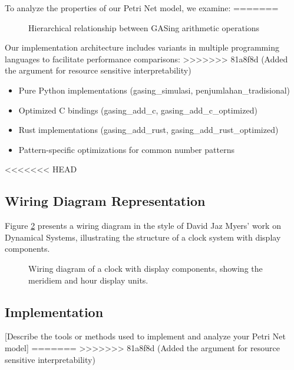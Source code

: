 To analyze the properties of our Petri Net model, we examine:
=======
\begin{figure}[H]
    \centering
    \caption{Hierarchical relationship between GASing arithmetic operations}
    \label{fig:gasing_operations}
\end{figure}

Our implementation architecture includes variants in multiple programming languages to facilitate performance comparisons:
>>>>>>> 81a8f8d (Added the argument for resource sensitive interpretability)

\begin{itemize}
    \item Pure Python implementations (gasing\_simulasi, penjumlahan\_tradisional)
    \item Optimized C bindings (gasing\_add\_c, gasing\_add\_c\_optimized)
    \item Rust implementations (gasing\_add\_rust, gasing\_add\_rust\_optimized)
    \item Pattern-specific optimizations for common number patterns
\end{itemize}
<<<<<<< HEAD

\subsection{Wiring Diagram Representation}

Figure \ref{fig:clock_with_display} presents a wiring diagram in the style of David Jaz Myers' work on Dynamical Systems, illustrating the structure of a clock system with display components.

\begin{figure}[htbp]
\centering

\caption{Wiring diagram of a clock with display components, showing the meridiem and hour display units.}
\label{fig:clock_with_display}
\end{figure}

\subsection{Implementation}

[Describe the tools or methods used to implement and analyze your Petri Net model]
=======
>>>>>>> 81a8f8d (Added the argument for resource sensitive interpretability)
